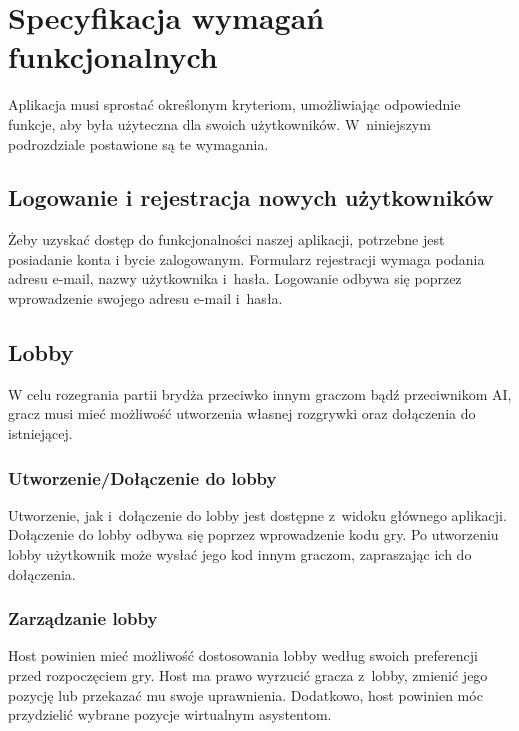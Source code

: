 




\section{Specyfikacja wymagań funkcjonalnych}
Aplikacja musi sprostać określonym kryteriom, umożliwiając odpowiednie funkcje,
aby była użyteczna dla swoich użytkowników. W~niniejszym podrozdziale
postawione są te wymagania.
\subsection{Logowanie i rejestracja nowych użytkowników}
Żeby uzyskać dostęp do funkcjonalności naszej aplikacji, potrzebne
jest posiadanie konta i bycie zalogowanym. Formularz rejestracji wymaga
podania adresu e-mail, nazwy użytkownika i~hasła. Logowanie odbywa się
poprzez wprowadzenie swojego adresu e-mail i~hasła.
\subsection{Lobby}
W celu rozegrania partii brydża przeciwko innym graczom bądź
przeciwnikom AI, gracz musi mieć możliwość utworzenia własnej
rozgrywki oraz dołączenia do istniejącej.
\subsubsection{Utworzenie/Dołączenie do lobby}
Utworzenie, jak i~dołączenie do lobby jest dostępne z~widoku głównego aplikacji. Dołączenie do lobby
odbywa się poprzez wprowadzenie kodu gry. Po utworzeniu lobby użytkownik może
wysłać jego kod innym graczom, zapraszając ich do dołączenia.
\subsubsection{Zarządzanie lobby}
Host powinien mieć możliwość dostosowania lobby według swoich preferencji przed
rozpoczęciem gry. Host ma prawo wyrzucić gracza z~lobby, zmienić jego pozycję lub przekazać
mu swoje uprawnienia. Dodatkowo, host powinien móc przydzielić wybrane pozycje
wirtualnym asystentom.
